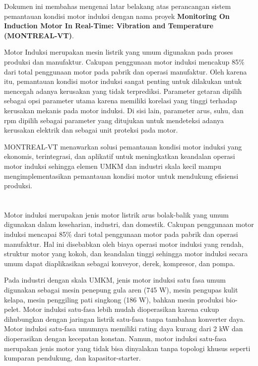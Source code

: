 \documentclass{elsinta}
\begin{document}
Dokumen ini membahas mengenai latar belakang atas
perancangan sistem pemantauan kondisi motor induksi
dengan nama proyek \textbf{Monitoring On Induction Motor In Real-Time: Vibration and Temperature
(MONTREAL-VT)}.

Motor Induksi merupakan mesin listrik yang umum
digunakan pada proses produksi dan manufaktur.
Cakupan penggunaan motor induksi mencakup 85\% dari
total penggunaan motor pada pabrik dan operasi manufaktur.
Oleh karena itu, pemantauan kondisi motor induksi sangat penting
untuk dilakukan untuk mencegah adanya kerusakan yang tidak terprediksi. Parameter getaran
dipilih sebagai opsi parameter utama karena memiliki korelasi yang tinggi terhadap kerusakan mekanis pada motor induksi.
Di sisi lain, parameter arus, suhu, dan rpm dipilih sebagai parameter yang ditujukan untuk mendeteksi
adanya kerusakan elektrik dan sebagai unit proteksi pada motor.

MONTREAL-VT menawarkan solusi pemantauan kondisi motor induksi yang ekonomis, terintegrasi, dan 
aplikatif untuk meningkatkan keandalan operasi motor induksi sehingga
elemen UMKM dan industri skala kecil mampu mengimplementasikan
pemantauan kondisi motor untuk mendukung efisiensi produksi.

\newpage
\section{\BackgroundTitle}
\subsection{\NeedTitle}
Motor induksi merupakan jenis motor listrik arus
bolak-balik yang umum digunakan dalam keseharian,
industri, dan domestik. Cakupan penggunaan motor
induksi mencapai 85\% dari total penggunaan
motor pada pabrik dan operasi manufaktur\cite{Ayankoso2026}. 
Hal ini disebabkan oleh biaya operasi  motor 
induksi yang rendah, struktur motor yang kokoh, 
dan keandalan tinggi sehingga motor induksi 
secara umum dapat diaplikasikan sebagai 
konveyor, derek, kompresor, dan pompa\cite{Kumar2019,Gangsar2020}.

Pada industri dengan skala UMKM,
jenis motor induksi satu fasa umum digunakan sebagai mesin penepung gula aren (745 W)\cite{Tua2021},
mesin pengupas kulit kelapa\cite{Putri2023}, mesin penggiling
pati singkong (186 W)\cite{Suryadi2026}, bahkan mesin produksi bio-pelet\cite{Ediwan2025}.
Motor induksi satu-fasa lebih mudah dioperasikan
karena cukup dihubungkan dengan jaringan listrik satu-fasa
tanpa tambahan konverter daya\cite{DAguanno2018}. Motor induksi satu-fasa
umumnya memiliki rating daya kurang dari 2 kW dan dioperasikan
dengan kecepatan konstan\cite{DAguanno2018,Pessina2012}.
Namun, motor induksi satu-fasa merupakan jenis motor
yang tidak bisa dinyalakan tanpa topologi khusus seperti
kumparan pendukung\cite{DAguanno2018}, dan kapasitor-starter\cite{Resketi2023}.
\end{document}
